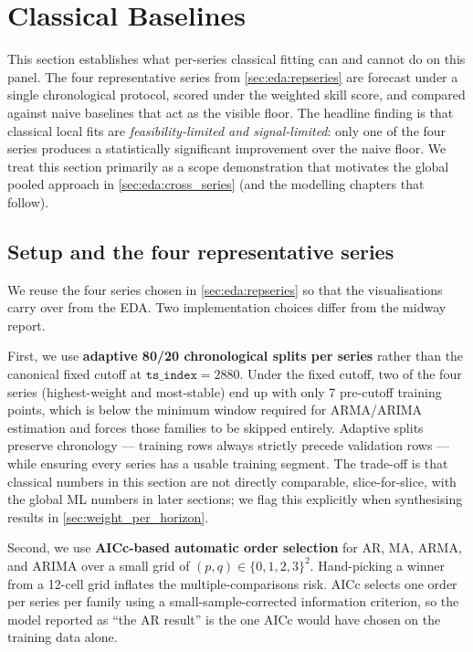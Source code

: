 \section{Classical Baselines}
\label{sec:classical}

This section establishes what per-series classical fitting can and cannot do on this panel. The four representative series from \cref{sec:eda:repseries} are forecast under a single chronological protocol, scored under the weighted skill score, and compared against naive baselines that act as the visible floor. The headline finding is that classical local fits are \emph{feasibility-limited and signal-limited}: only one of the four series produces a statistically significant improvement over the naive floor. We treat this section primarily as a scope demonstration that motivates the global pooled approach in \cref{sec:eda:cross_series} (and the modelling chapters that follow).

\subsection{Setup and the four representative series}
\label{sec:classical:setup}

We reuse the four series chosen in \cref{sec:eda:repseries} so that the visualisations carry over from the EDA. Two implementation choices differ from the midway report.

First, we use \textbf{adaptive 80/20 chronological splits per series} rather than the canonical fixed cutoff at $\mathtt{ts\_index} = 2880$. Under the fixed cutoff, two of the four series (highest-weight and most-stable) end up with only 7 pre-cutoff training points, which is below the minimum window required for ARMA/ARIMA estimation and forces those families to be skipped entirely. Adaptive splits preserve chronology --- training rows always strictly precede validation rows --- while ensuring every series has a usable training segment. The trade-off is that classical numbers in this section are not directly comparable, slice-for-slice, with the global ML numbers in later sections; we flag this explicitly when synthesising results in \cref{sec:weight_per_horizon}.

Second, we use \textbf{AICc-based automatic order selection} for AR, MA, ARMA, and ARIMA over a small grid of $(p, q) \in \{0, 1, 2, 3\}^2$. Hand-picking a winner from a 12-cell grid inflates the multiple-comparisons risk. AICc selects one order per series per family using a small-sample-corrected information criterion, so the model reported as ``the AR result'' is the one AICc would have chosen on the training data alone.

